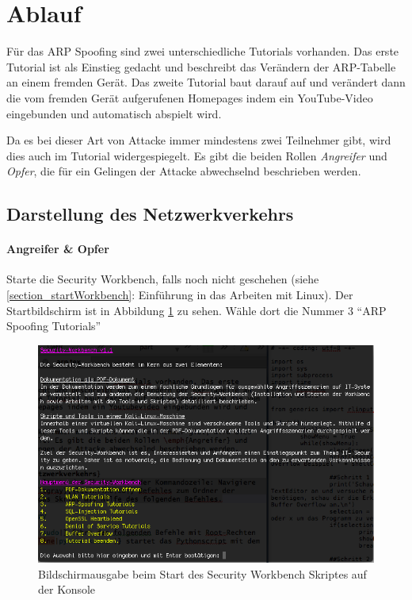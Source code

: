 \section{Ablauf}
Für das ARP Spoofing sind zwei unterschiedliche Tutorials vorhanden. Das erste Tutorial ist als Einstieg gedacht und beschreibt das Verändern der ARP-Tabelle an einem fremden Gerät. Das zweite Tutorial baut darauf auf und verändert dann die vom fremden Gerät aufgerufenen Homepages indem ein YouTube-Video eingebunden und automatisch abspielt wird.

Da es bei dieser Art von Attacke immer mindestens zwei Teilnehmer gibt, wird dies auch im Tutorial widergespiegelt. Es gibt die beiden Rollen \emph{Angreifer} und \emph{Opfer}, die für ein Gelingen der Attacke abwechselnd beschrieben werden.


\subsection{Darstellung des Netzwerkverkehrs}
\paragraph{Angreifer \& Opfer} Starte die Security Workbench, falls noch nicht geschehen (siehe \ref{section_startWorkbench}: Einführung in das Arbeiten mit Linux). Der Startbildschirm ist in Abbildung \ref{fig:scriptstart} zu sehen. Wähle dort die Nummer 3 \enquote{ARP Spoofing Tutorials}

\begin{figure}
	\centering
	\includegraphics[width=\textwidth]{images/Scriptstart}
	\caption{Bildschirmausgabe beim Start des Security Workbench Skriptes auf der Konsole}
	\label{fig:scriptstart}
\end{figure}

